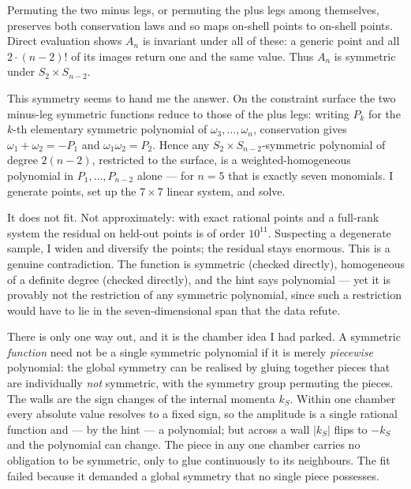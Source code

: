 \documentclass[11pt]{article}
\begin{document}
Permuting the two minus legs, or permuting the plus legs among themselves, preserves both
conservation laws and so maps on-shell points to on-shell points. Direct evaluation shows $A_n$
is invariant under all of these: a generic point and all $2\cdot(n-2)!$ of its images return one
and the same value. Thus $A_n$ is symmetric under $S_2\times S_{n-2}$.

This symmetry seems to hand me the answer. On the constraint surface the two minus-leg
symmetric functions reduce to those of the plus legs: writing $P_k$ for the $k$-th elementary
symmetric polynomial of $\omega_3,\dots,\omega_n$, conservation gives $\omega_1+\omega_2=-P_1$
and $\omega_1\omega_2=P_2$. Hence any $S_2\times S_{n-2}$-symmetric polynomial of degree
$2(n-2)$, restricted to the surface, is a weighted-homogeneous polynomial in $P_1,\dots,P_{n-2}$
alone --- for $n=5$ that is exactly seven monomials. I generate points, set up the $7\times7$
linear system, and solve.

It does not fit. Not approximately: with exact rational points and a full-rank system the
residual on held-out points is of order $10^{11}$. Suspecting a degenerate sample, I widen and
diversify the points; the residual stays enormous. This is a genuine contradiction. The function
is symmetric (checked directly), homogeneous of a definite degree (checked directly), and the
hint says polynomial --- yet it is provably not the restriction of any symmetric polynomial,
since such a restriction would have to lie in the seven-dimensional span that the data refute.

There is only one way out, and it is the chamber idea I had parked. A symmetric \emph{function}
need not be a single symmetric polynomial if it is merely \emph{piecewise} polynomial: the
global symmetry can be realised by gluing together pieces that are individually \emph{not}
symmetric, with the symmetry group permuting the pieces. The walls are the sign changes of the
internal momenta $k_S$. Within one chamber every absolute value resolves to a fixed sign, so the
amplitude is a single rational function and --- by the hint --- a polynomial; but across a wall
$|k_S|$ flips to $-k_S$ and the polynomial can change. The piece in any one chamber carries no
obligation to be symmetric, only to glue continuously to its neighbours. The fit failed because
it demanded a global symmetry that no single piece possesses.
\end{document}
